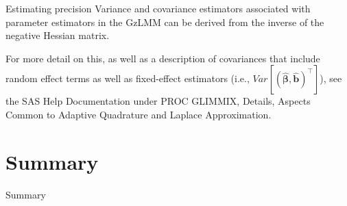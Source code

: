 \documentclass[
  9pt,
  ignorenonframetext,
]{beamer}
\begin{document}
\begin{frame}{Estimating precision}
\protect\hypertarget{estimating-precision}{}
Variance and covariance estimators associated with parameter estimators
in the GzLMM can be derived from the inverse of the negative Hessian
matrix.

For more detail on this, as well as a description of covariances that
include random effect terms as well as fixed-effect estimators (i.e.,
\(Var[(\pmb {\hat \beta}, \pmb {\hat b})^{\top}]\)), see the SAS Help
Documentation under PROC GLIMMIX, Details, Aspects Common to Adaptive
Quadrature and Laplace Approximation.
\end{frame}

\hypertarget{summary}{%
\section{Summary}\label{summary}}

\begin{frame}{Summary}
\protect\hypertarget{summary-1}{}
\end{frame}
\end{document}
